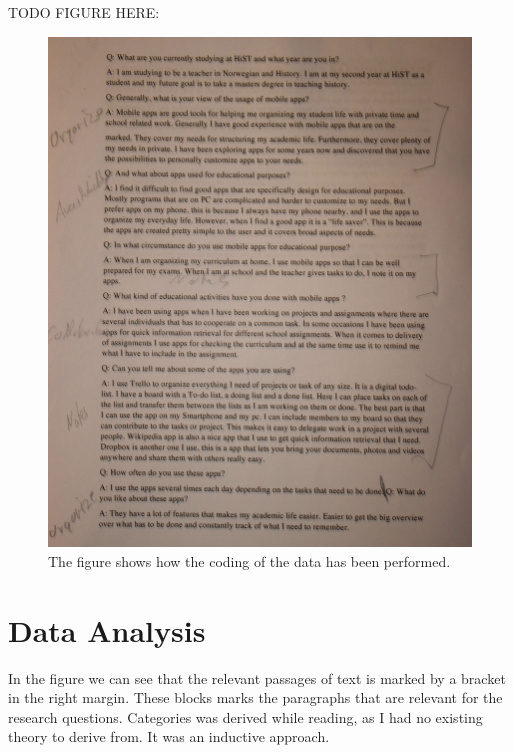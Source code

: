 \documentclass[12pt, a4paper]{article}
\begin{document}
TODO FIGURE HERE: 
\begin{figure}[htb]
    \centering
    \includegraphics[width=\textwidth]{coding} 
    \label{fig:coding}
The figure shows how the coding of the data has been performed. 
\end{figure}

\section{Data Analysis} %

In the figure we can see that the relevant passages of text is marked by a
bracket in the right margin. These blocks marks the paragraphs that are relevant for
the research questions. Categories was derived while reading, as I had no
existing theory to derive from. It was an inductive approach.  
\end{document}
